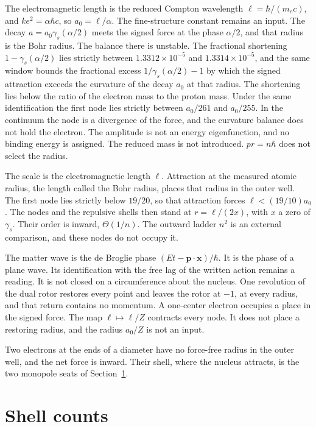 \documentclass[a4paper]{article}
\begin{document}
The electromagnetic length is the reduced Compton wavelength \(\ell=\hbar/(m_e c)\), and \(k e^{2}=\alpha\hbar c\), so \(a_0=\ell/\alpha\). The fine-structure constant remains an input. The decay \(a=a_0\gamma_s(\alpha/2)\) meets the signed force at the phase \(\alpha/2\), and that radius is the Bohr radius. The balance there is unstable. The fractional shortening \(1-\gamma_s(\alpha/2)\) lies strictly between \(1.3312\times 10^{-5}\) and \(1.3314\times 10^{-5}\), and the same window bounds the fractional excess \(1/\gamma_s(\alpha/2)-1\) by which the signed attraction exceeds the curvature of the decay \(a_0\) at that radius. The shortening lies below the ratio of the electron mass to the proton mass. Under the same identification the first node lies strictly between \(a_0/261\) and \(a_0/255\). In the continuum the node is a divergence of the force, and the curvature balance does not hold the electron. The amplitude is not an energy eigenfunction, and no binding energy is assigned. The reduced mass is not introduced. \(pr=n\hbar\) does not select the radius.

The scale is the electromagnetic length \(\ell\). Attraction at the measured atomic radius, the length called the Bohr radius, places that radius in the outer well. The first node lies strictly below \(19/20\), so that attraction forces \(\ell<(19/10)a_0\). The nodes and the repulsive shells then stand at \(r=\ell/(2x)\), with \(x\) a zero of \(\gamma_s\). Their order is inward, \(\Theta(1/n)\). The outward ladder \(n^2\) is an external comparison, and these nodes do not occupy it.

The matter wave is the de Broglie phase \((Et-\mathbf{p}\cdot\mathbf{x})/\hbar\). It is the phase of a plane wave. Its identification with the free lag of the written action remains a reading. It is not closed on a circumference about the nucleus. One revolution of the dual rotor restores every point and leaves the rotor at \(-1\), at every radius, and that return contains no momentum. A one-center electron occupies a place in the signed force. The map \(\ell\mapsto\ell/Z\) contracts every node. It does not place a restoring radius, and the radius \(a_0/Z\) is not an input.

Two electrons at the ends of a diameter have no force-free radius in the outer well, and the net force is inward. Their shell, where the nucleus attracts, is the two monopole seats of Section~\ref{sec:shells}.

\section{Shell counts}
\label{sec:shells}
\end{document}
